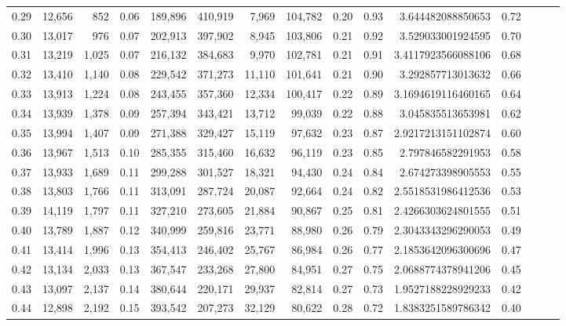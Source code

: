 \begin{tabular}{rrrrrrrrrrrrrrr}
0.29 &  12,656 &    852 &  0.06 &  189,896 &  410,919 &    7,969 &  104,782 &  0.20 &  0.93 &     3.644482088850653 &      0.72 \\
0.30 &  13,017 &    976 &  0.07 &  202,913 &  397,902 &    8,945 &  103,806 &  0.21 &  0.92 &     3.529033001924595 &      0.70 \\
0.31 &  13,219 &  1,025 &  0.07 &  216,132 &  384,683 &    9,970 &  102,781 &  0.21 &  0.91 &    3.4117923566088106 &      0.68 \\
0.32 &  13,410 &  1,140 &  0.08 &  229,542 &  371,273 &   11,110 &  101,641 &  0.21 &  0.90 &     3.292857713013632 &      0.66 \\
0.33 &  13,913 &  1,224 &  0.08 &  243,455 &  357,360 &   12,334 &  100,417 &  0.22 &  0.89 &    3.1694619116460165 &      0.64 \\
0.34 &  13,939 &  1,378 &  0.09 &  257,394 &  343,421 &   13,712 &   99,039 &  0.22 &  0.88 &     3.045835513653981 &      0.62 \\
0.35 &  13,994 &  1,407 &  0.09 &  271,388 &  329,427 &   15,119 &   97,632 &  0.23 &  0.87 &    2.9217213151102874 &      0.60 \\
0.36 &  13,967 &  1,513 &  0.10 &  285,355 &  315,460 &   16,632 &   96,119 &  0.23 &  0.85 &     2.797846582291953 &      0.58 \\
0.37 &  13,933 &  1,689 &  0.11 &  299,288 &  301,527 &   18,321 &   94,430 &  0.24 &  0.84 &     2.674273398905553 &      0.55 \\
0.38 &  13,803 &  1,766 &  0.11 &  313,091 &  287,724 &   20,087 &   92,664 &  0.24 &  0.82 &    2.5518531986412536 &      0.53 \\
0.39 &  14,119 &  1,797 &  0.11 &  327,210 &  273,605 &   21,884 &   90,867 &  0.25 &  0.81 &    2.4266303624801555 &      0.51 \\
0.40 &  13,789 &  1,887 &  0.12 &  340,999 &  259,816 &   23,771 &   88,980 &  0.26 &  0.79 &    2.3043343296290053 &      0.49 \\
0.41 &  13,414 &  1,996 &  0.13 &  354,413 &  246,402 &   25,767 &   86,984 &  0.26 &  0.77 &    2.1853642096300696 &      0.47 \\
0.42 &  13,134 &  2,033 &  0.13 &  367,547 &  233,268 &   27,800 &   84,951 &  0.27 &  0.75 &    2.0688774378941206 &      0.45 \\
0.43 &  13,097 &  2,137 &  0.14 &  380,644 &  220,171 &   29,937 &   82,814 &  0.27 &  0.73 &    1.9527188228929233 &      0.42 \\
0.44 &  12,898 &  2,192 &  0.15 &  393,542 &  207,273 &   32,129 &   80,622 &  0.28 &  0.72 &    1.8383251589786342 &      0.40 \\

\end{tabular}
